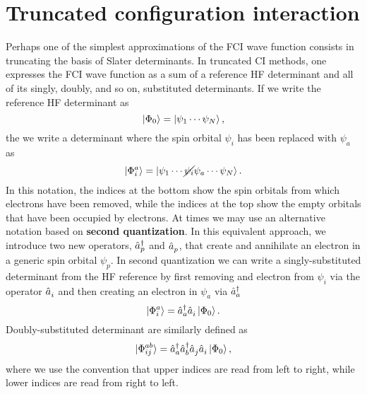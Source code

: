 \documentclass[../Main/chem532-notes.tex]{subfiles}
\begin{document}
\section{Truncated configuration interaction}
Perhaps one of the simplest approximations of the FCI wave function consists in truncating the basis of Slater determinants.
In truncated CI methods, one expresses the FCI wave function as a sum of a reference HF determinant and all of its singly, doubly, and so on, substituted determinants.
If we write the reference HF determinant as
\begin{equation}
\ket{\Phi_0} = \ket{\psi_1 \cdots \psi_N},
\end{equation}
the we write a determinant where the spin orbital $\psi_i$ has been replaced with $\psi_a$ as
\begin{equation}
\ket{\Phi_{i}^{a}} = \ket{\psi_1 \cdots  \cancel{\psi_i} \psi_a\cdots\psi_N}.
\end{equation}
In this notation, the indices at the bottom show the spin orbitals from which electrons have been removed, while the indices at the top show the empty orbitals that have been occupied by electrons.
At times we may use an alternative notation based on \textbf{second quantization}. In this equivalent approach, we introduce two new operators, $\hat{a}_{p}^{\dagger}$ and $\hat{a}_{p}^{\,}$, that create and annihilate an electron in a generic spin orbital $\psi_p$. In second quantization we can write a singly-substituted determinant from the HF reference by first removing and electron from $\psi_i$ via the operator $\hat{a}_{i}^{\,}$ and then creating an electron in $\psi_a$ via $\hat{a}_{a}^{\dagger}$
\begin{equation}
\ket{\Phi_{i}^{a}} = \hat{a}_{a}^{\dagger}\hat{a}_{i}^{\,} \ket{\Phi_0}.
\end{equation}
Doubly-substituted determinant are similarly defined as
\begin{equation}
\ket{\Phi_{ij}^{ab}} = \hat{a}_{a}^{\dagger}\hat{a}_{b}^{\dagger}\hat{a}_{j}^{\,}\hat{a}_{i}^{\,} \ket{\Phi_0},
\end{equation}
where we use the convention that upper indices are read from left to right, while lower indices are read from right to left.
\end{document}
